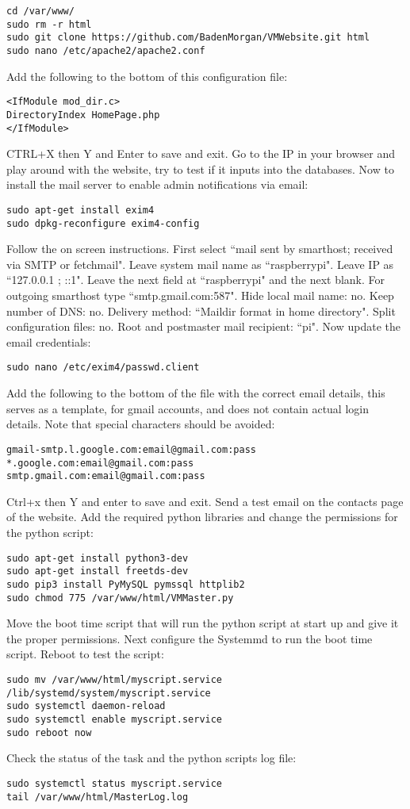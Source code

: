 \documentclass[a4paper,11pt]{article}
\numberwithin{figure}{section}
\numberwithin{table}{section}
\begin{document}
\begin{appendices}
\begin{lstlisting}[firstnumber=16]
cd /var/www/
sudo rm -r html
sudo git clone https://github.com/BadenMorgan/VMWebsite.git html
sudo nano /etc/apache2/apache2.conf
\end{lstlisting}
Add the following to the bottom of this configuration file:
\begin{lstlisting}[firstnumber=20]
<IfModule mod_dir.c>
DirectoryIndex HomePage.php
</IfModule>
\end{lstlisting}
CTRL+X then Y and Enter to save and exit. Go to the IP in your browser and play around with the website, try to test if it inputs into the databases. Now to install the mail server to enable admin notifications via email:
\begin{lstlisting}[firstnumber=23]
sudo apt-get install exim4
sudo dpkg-reconfigure exim4-config
\end{lstlisting}
Follow the on screen instructions. First select ``mail sent by smarthost; received via SMTP or fetchmail". Leave system mail name as ``raspberrypi". Leave IP as ``127.0.0.1 ; ::1". Leave the next field at ``raspberrypi" and the next blank. For outgoing smarthost type ``smtp.gmail.com:587". Hide local mail name: no. Keep number of DNS: no. Delivery method: ``Maildir format in home directory". Split configuration files: no. Root and postmaster mail recipient: ``pi". Now update the email credentials:
\begin{lstlisting}[firstnumber=25]
sudo nano /etc/exim4/passwd.client
\end{lstlisting}
Add the following to the bottom of the file with the correct email details, this serves as a template, for gmail accounts, and does not contain actual login details. Note that special characters should be avoided:
\begin{lstlisting}[firstnumber=26]
gmail-smtp.l.google.com:email@gmail.com:pass
*.google.com:email@gmail.com:pass
smtp.gmail.com:email@gmail.com:pass
\end{lstlisting}
Ctrl+x then Y and enter to save and exit. Send a test email on the contacts page of the website. Add the required python libraries and change the permissions for the python script:
\begin{lstlisting}[firstnumber=29]
sudo apt-get install python3-dev
sudo apt-get install freetds-dev
sudo pip3 install PyMySQL pymssql httplib2
sudo chmod 775 /var/www/html/VMMaster.py
\end{lstlisting}
Move the boot time script that will run the python script at start up and give it the proper permissions. Next configure the Systemmd to run the boot time script. Reboot to test the script:
\begin{lstlisting}[firstnumber=33]
sudo mv /var/www/html/myscript.service /lib/systemd/system/myscript.service
sudo systemctl daemon-reload
sudo systemctl enable myscript.service
sudo reboot now
\end{lstlisting}
Check the status of the task and the python scripts log file:
\begin{lstlisting}[firstnumber=37]
sudo systemctl status myscript.service
tail /var/www/html/MasterLog.log
\end{lstlisting}


\end{appendices}
\end{document}
